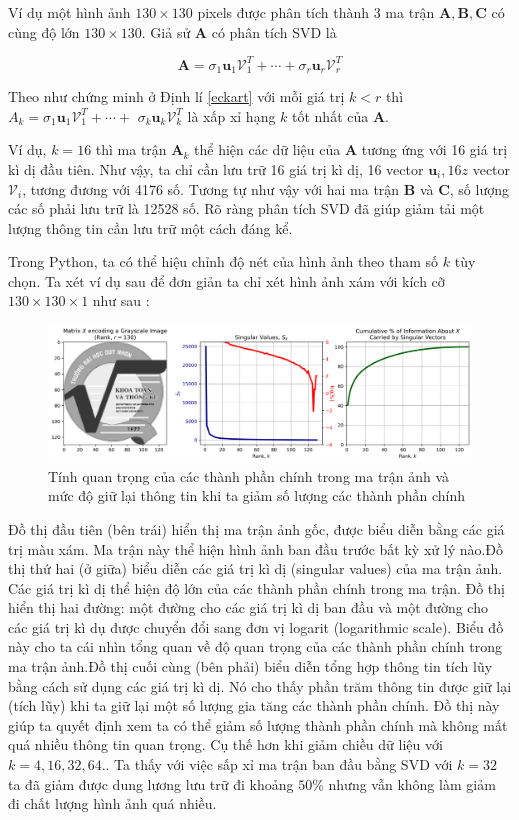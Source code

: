 \documentclass[14pt,oneside,a4paper]{report}
\numberwithin{equation}{section}
\begin{document}
Ví dụ một hình ảnh $130 \times 130$ pixels được phân tích thành 3 ma trận $\mathbf{A}, \mathbf{B}, \mathbf{C}$ có cùng độ lớn $130 \times 130$. Giả sử $\mathbf{A}$ có phân tích SVD là

$$
\mathbf{A}=\sigma_{1} \mathbf{u}_{1} \mathcal{V}_{1}^{T}+\cdots+\sigma_{r} \mathbf{u}_{r} \mathcal{V}_{r}^{T}
$$

Theo như chứng minh ở Định lí \ref{eckart} với mỗi giá trị $k<r$ thì $A_{k}=\sigma_{1} \mathbf{u}_{1} \mathcal{V}_{1}^{T}+\cdots+$ $\sigma_{k} \mathbf{u}_{k} \mathcal{V}_{k}^{T}$ là xấp xỉ hạng $k$ tốt nhất của $\mathbf{A}$.

Ví dụ, $k=16$ thì ma trận $\mathbf{A}_{k}$ thể hiện các dữ liệu của $\mathbf{A}$ tương ứng với 16 giá trị kì dị đầu tiên. Như vậy, ta chỉ cần lưu trữ 16 giá trị kì dị, 16 vector $\mathbf{u}_{i}, 16z $ vector $\mathcal{V}_{i}$, tương đương với 4176 số. Tương tự như vậy với hai ma trận $\mathbf{B}$ và $\mathbf{C}$, số lượng các số phải lưu trữ là 12528 số. Rõ ràng phân tích SVD đã giúp giảm tải một lượng thông tin cần lưu trữ một cách đáng kể.

Trong  Python, ta có thể hiệu chỉnh độ nét của hình ảnh theo tham số $k$ tùy chọn. Ta xét ví dụ sau để đơn giản ta chỉ xét hình ảnh xám với kích cỡ $130 \times 130 \times1 $ như sau :

\begin{figure}[htp]
\centering
\includegraphics[scale=0.5]{image-singular-values.png}
\caption{Tính quan trọng của các thành phần chính trong ma trận ảnh và mức độ giữ lại thông tin khi ta giảm số lượng các thành phần chính}
\label{fig:svd_sigular}
\end{figure}

Đồ thị đầu tiên (bên trái) hiển thị ma trận ảnh gốc, được biểu diễn bằng các giá trị màu xám. Ma trận này thể hiện hình ảnh ban đầu trước bất kỳ xử lý nào.Đồ thị thứ hai (ở giữa) biểu diễn các giá trị kì dị (singular values) của ma trận ảnh. Các giá trị kì dị thể hiện độ lớn của các thành phần chính trong ma trận. Đồ thị hiển thị hai đường: một đường cho các giá trị kì dị ban đầu và một đường cho các giá trị kì dụ được chuyển đổi sang đơn vị logarit (logarithmic scale). Biểu đồ này cho ta cái nhìn tổng quan về độ quan trọng của các thành phần chính trong ma trận ảnh.Đồ thị cuối cùng (bên phải) biểu diễn tổng hợp thông tin tích lũy bằng cách sử dụng các giá trị kì dị. Nó cho thấy phần trăm thông tin được giữ lại (tích lũy) khi ta giữ lại một số lượng gia tăng các thành phần chính. Đồ thị này giúp ta quyết định xem ta có thể giảm số lượng thành phần chính mà không mất quá nhiều thông tin quan trọng.
Cụ thế hơn khi giảm chiều dữ liệu với $k = 4,16, 32 ,64.$. Ta thấy với việc sấp xỉ ma trận ban đầu bằng SVD với $ k=32 $ ta đã giảm được dung lương lưu trữ đi khoảng $50\%$ nhưng vẫn không làm giảm đi chất lượng hình ảnh quá nhiều.
\end{document}

